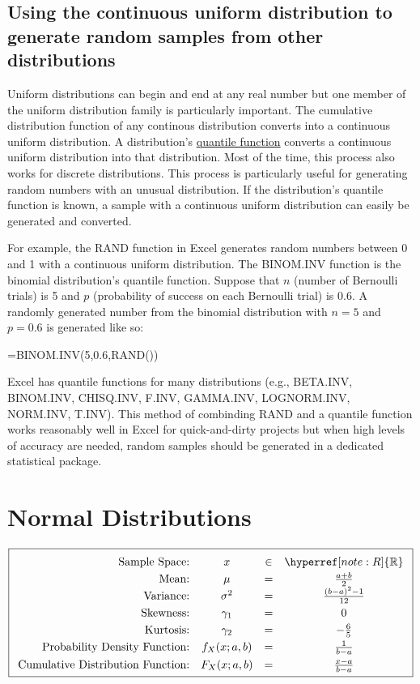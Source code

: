 \documentclass[nohyper,justified,marginals=raggedright]{tufte-book}\usepackage[]{graphicx}\usepackage[]{color}
\begin{document}
\subsection{Using the continuous uniform distribution to generate random samples from other distributions}

Uniform distributions can begin and end at any real number but one member of the uniform distribution family is particularly important. The cumulative distribution function of any continous distribution converts into a continuous uniform distribution. A distribution's \hyperref[sec;Quantile]{quantile function} converts a continuous uniform distribution into that distribution. Most of the time, this process also works for discrete distributions. This process is particularly useful for generating random numbers with an unusual distribution. If the distribution's quantile function is known, a sample with a continuous uniform distribution can easily be generated and converted.

For example, the \textsf{RAND} function in Excel generates random numbers between 0 and 1 with a continuous uniform distribution. The \textsf{BINOM.INV} function is the binomial distribution's quantile function. Suppose that $n$ (number of Bernoulli trials) is 5 and $p$ (probability of success on each Bernoulli trial) is 0.6. A randomly generated number from the binomial distribution with $n=5$ and $p=0.6$ is generated like so:

\textsf{=BINOM.INV(5,0.6,RAND())}

Excel has quantile functions for many distributions (e.g., \textsf{BETA.INV, BINOM.INV, CHISQ.INV, F.INV, GAMMA.INV, LOGNORM.INV, NORM.INV, T.INV}). This method of combinding \textsf{RAND} and a quantile function works reasonably well in Excel for quick-and-dirty projects but when high levels of accuracy are needed, random samples should be generated in a dedicated statistical package.

\section{Normal Distributions}

\begin{equation*}
\boxed{
\setlength{\extrarowheight}{3pt}
\begin{array}{rccc}
\text{Sample Space:} & x &\in&\hyperref [note:R]{\mathbb{R}}\\
\text{Mean:} & \mu&=&\frac{a+b}{2} \\
\text{Variance:} & \sigma^2&=&\frac{(b-a)^2-1}{12} \\
\text{Skewness:} & \gamma_1&=&0 \\
\text{Kurtosis:} & \gamma_2&=&-\frac{6}{5} \\
\text{Probability Density Function:} & f_X(x;a,b)&=&\frac{1}{b-a} \\
\text{Cumulative Distribution Function:} & F_X(x;a,b)&=&\frac{x-a}{b-a} \\
\end{array}
}
\end{equation*}
\end{document}
